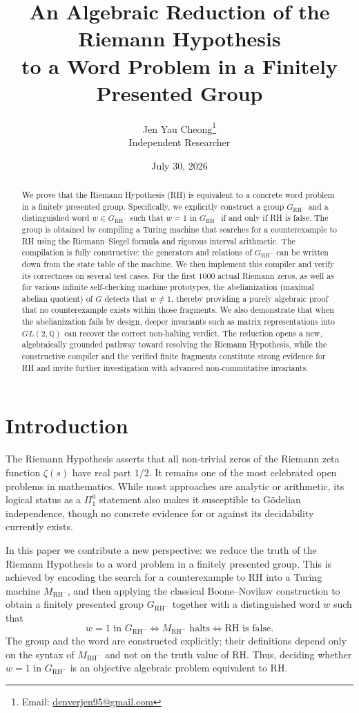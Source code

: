 \documentclass[11pt,a4paper]{article}
\title{\textbf{An Algebraic Reduction of the Riemann Hypothesis\\ to a Word Problem in a Finitely Presented Group}}
\author{Jen Yau Cheong\thanks{Email: \href{mailto:denverjen95@gmail.com}{denverjen95@gmail.com}} \\
\small Independent Researcher}
\date{July 30, 2026}
\begin{document}
\maketitle

\begin{abstract}
We prove that the Riemann Hypothesis (RH) is equivalent to a concrete word problem in a finitely presented group. Specifically, we explicitly construct a group \(G_{\text{RH}^-}\) and a distinguished word \(w \in G_{\text{RH}^-}\) such that \(w = 1\) in \(G_{\text{RH}^-}\) if and only if RH is false. The group is obtained by compiling a Turing machine that searches for a counterexample to RH using the Riemann–Siegel formula and rigorous interval arithmetic. The compilation is fully constructive: the generators and relations of \(G_{\text{RH}^-}\) can be written down from the state table of the machine. We then implement this compiler and verify its correctness on several test cases. For the first $1000$ actual Riemann zeros, as well as for various infinite self‑checking machine prototypes, the abelianization (maximal abelian quotient) of \(G\) detects that \(w \neq 1\), thereby providing a purely algebraic proof that no counterexample exists within those fragments. We also demonstrate that when the abelianization fails by design, deeper invariants such as matrix representations into \(GL(2,\mathbb{Q})\) can recover the correct non‑halting verdict. The reduction opens a new, algebraically grounded pathway toward resolving the Riemann Hypothesis, while the constructive compiler and the verified finite fragments constitute strong evidence for RH and invite further investigation with advanced non‑commutative invariants.
\end{abstract}

\section{Introduction}

The Riemann Hypothesis asserts that all non‑trivial zeros of the Riemann zeta function \(\zeta(s)\) have real part \(1/2\). It remains one of the most celebrated open problems in mathematics. While most approaches are analytic or arithmetic, its logical status as a \(\Pi^0_1\) statement also makes it susceptible to Gödelian independence, though no concrete evidence for or against its decidability currently exists.

In this paper we contribute a new perspective: we reduce the truth of the Riemann Hypothesis to a word problem in a finitely presented group. This is achieved by encoding the search for a counterexample to RH into a Turing machine \(M_{\text{RH}^-}\), and then applying the classical Boone–Novikov construction to obtain a finitely presented group \(G_{\text{RH}^-}\) together with a distinguished word \(w\) such that
\[
w = 1 \text{ in } G_{\text{RH}^-} \iff M_{\text{RH}^-} \text{ halts} \iff \text{RH is false.}
\]
The group and the word are constructed explicitly; their definitions depend only on the syntax of \(M_{\text{RH}^-}\) and not on the truth value of RH. Thus, deciding whether \(w = 1\) in \(G_{\text{RH}^-}\) is an objective algebraic problem equivalent to RH.
\end{document}
